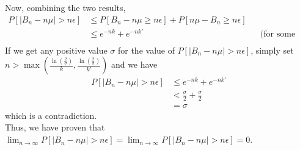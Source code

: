 Now, combining the two results,
\begin{align*}
    P[\lvert B_n - n\mu\rvert > n\epsilon] &\le P[B_n - n\mu \ge n\epsilon] + P[n\mu - B_n \ge n\epsilon]\\
    &\le e^{-nk} + e^{-nk'} && \text{(for some positive coefficients k and k')}\\
\end{align*}
If we get any positive value $\sigma$ for the value of $P[\lvert B_n - n\mu\rvert > n\epsilon]$, simply set $n > \max(\frac{\ln(\frac{2}{\sigma})}{k}, \frac{\ln(\frac{2}{\sigma})}{k'})$ and we have
\begin{align*}
    P[\lvert B_n - n\mu\rvert > n\epsilon] &\le e^{-nk} + e^{-nk'}\\
    &< \frac{\sigma}{2} + \frac{\sigma}{2}\\
    &= \sigma
\end{align*}
which is a contradiction.\\
Thus, we have proven that $\lim_{n\to \infty}P[\lvert B_n - n\mu\rvert > n\epsilon]=\lim_{n\to \infty}P[\lvert B_n - n\mu\rvert > n\epsilon]=0$.\\